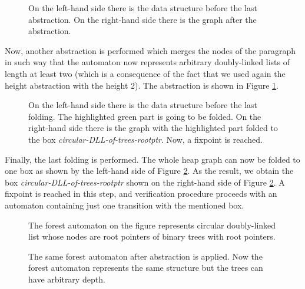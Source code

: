 {\begin{figure}[bt]
\begin{center}
\scalebox{.7} {
  \begin{subfigure}[b]{0.49\linewidth}
  \end{subfigure}
  \begin{subfigure}[b]{0.49\linewidth}
  \end{subfigure}
}
\end{center}
\caption{On the left-hand side there is the data structure before the last abstraction.
On the right-hand side there is the graph after the abstraction.}
\label{ref:fig-re4}
\end{figure}

Now, another abstraction is performed which merges the nodes of the paragraph in such way that the automaton now represents
arbitrary doubly-linked lists of length at least two (which is a consequence
of the fact that we used again the height abstraction with the height 2).
The abstraction is shown in Figure \ref{ref:fig-re4}.

\begin{figure}[bt]
\begin{center}
\scalebox{.7} {
  \begin{subfigure}[b]{0.49\linewidth}
  \end{subfigure}
  \begin{subfigure}[b]{0.49\linewidth}
  \end{subfigure}
}
\end{center}
\caption{On the left-hand side there is the data structure before the last folding. The highlighted green part is going to be folded.
On the right-hand side there is the graph with the highlighted part folded to the box \emph{circular-DLL-of-trees-rootptr}.
Now, a fixpoint is reached.}
\label{ref:fig-re5}
\end{figure}

Finally, the last folding is performed.
The whole heap graph can now be folded to one box as shown by the left-hand side of Figure \ref{ref:fig-re5}.
As the result, we obtain the box \emph{circular-DLL-of-trees-rootptr} shown on the right-hand side
of Figure \ref{ref:fig-re5}.
A fixpoint is reached in this step, and verification procedure proceeds with an automaton containing
just one transition with the mentioned box.

    
\begin{figure}[bt]
\begin{center}
    \exmp
\caption{The forest automaton on the figure represents circular doubly-linked list whose nodes are root pointers of binary trees with root pointers.}
    \label{ref:fig-re6.1}
      
\caption{The same forest automaton after abstraction is applied. Now the forest automaton represents the same structure but the trees can have arbitrary depth.}
     \label{ref:fig-re6.2}
\end{center}
\end{figure}

}
